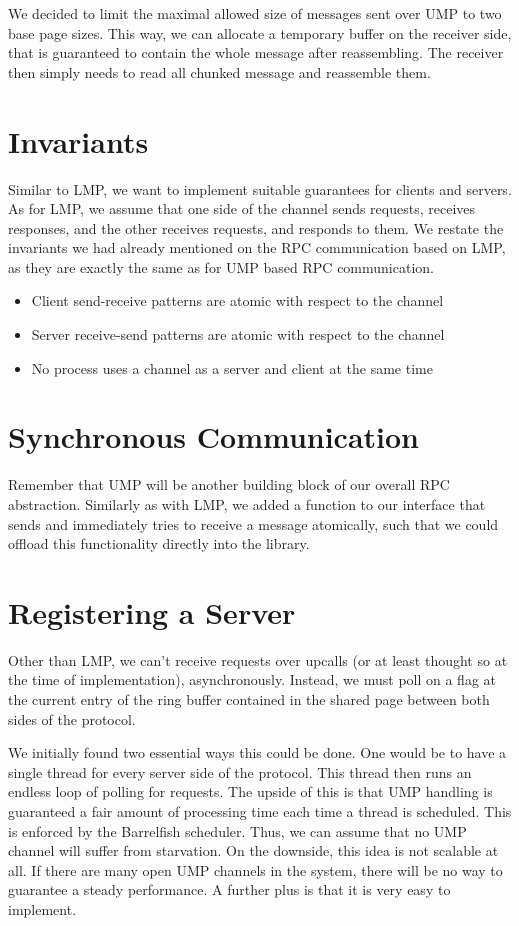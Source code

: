 We decided to limit the maximal allowed size of messages sent over UMP to two
base page sizes. This way, we can allocate a temporary buffer on the receiver
side, that is guaranteed to contain the whole message after reassembling. The
receiver then simply needs to read all chunked message and reassemble them.

\section{Invariants}
Similar to LMP, we want to implement suitable guarantees for clients and servers.
As for LMP, we assume that one side of the channel sends requests, receives responses,
and the other receives requests, and responds to them. 
We restate the invariants we had already mentioned on the RPC communication based on LMP, as they
are exactly the same as for UMP based RPC communication.

\begin{itemize}
    \item Client send-receive patterns are atomic with respect to the channel
    \item Server receive-send patterns are atomic with respect to the channel
    \item No process uses a channel as a server and client at the same time
\end{itemize}

\section{Synchronous Communication}
Remember that UMP will be another building block of our overall RPC abstraction.
Similarly as with LMP, we added a function to our interface that sends and immediately
tries to receive a message atomically, such that we could offload this functionality directly into the library.

\section{Registering a Server}
Other than LMP, we can't receive requests over upcalls (or at least thought so at the time of implementation), asynchronously. Instead, we must poll 
on a flag at the current entry of the ring buffer contained in the shared page between both sides of the protocol.

We initially found two essential ways this could be done. One would be to have a single thread for every server side of the protocol.
This thread then runs an endless loop of polling for requests. The upside of this is that UMP handling is guaranteed
a fair amount of processing time each time a thread is scheduled. This is enforced by the Barrelfish scheduler. Thus, we can assume
that no UMP channel will suffer from starvation. On the downside, this idea is not scalable at all. If there are many open UMP channels
in the system, there will be no way to guarantee a steady performance. A further plus is that
it is very easy to implement.

